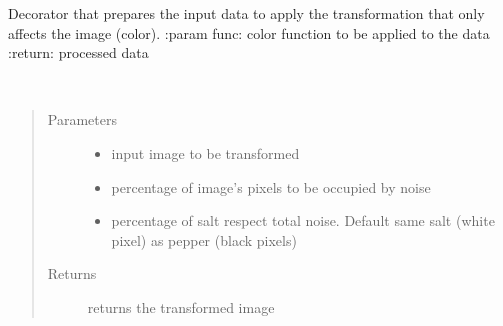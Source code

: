 \documentclass[letterpaper,10pt,english]{sphinxmanual}
\begin{document}

\begin{fulllineitems}
\label{\detokenize{ida_lib.operations:ida_lib.operations.pixel_ops_functional.prepare_data_for_opencv}}
Decorator that prepares the input data to apply the transformation that only affects the image (color).
:param func: color function to be applied to the data
:return: processed data

\end{fulllineitems}


\begin{fulllineitems}
\label{\detokenize{ida_lib.operations:ida_lib.operations.pixel_ops_functional.salt_and_pepper_noise}}~\begin{quote}\begin{description}
\item[{Parameters}] \leavevmode\begin{itemize}
\item {} 
 \textendash{} input image to be transformed

\item {} 
 \textendash{} percentage of image’s pixels to be occupied by noise

\item {} 
 \textendash{} percentage of salt respect total noise. Default same salt (white pixel) as pepper (black pixels)

\end{itemize}

\item[{Returns}] \leavevmode
returns the transformed image

\end{description}\end{quote}

\end{fulllineitems}
\end{document}

